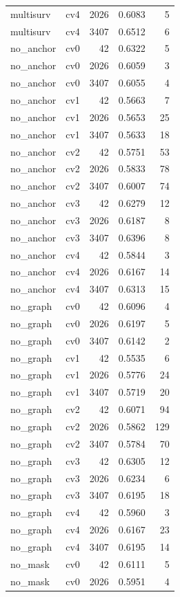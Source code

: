 \documentclass[10pt]{article}
\begin{document}
\begin{longtable}{llrrr}
multisurv & cv4 & 2026 & 0.6083 & 5\\
multisurv & cv4 & 3407 & 0.6512 & 6\\
no\_anchor & cv0 & 42 & 0.6322 & 5\\
no\_anchor & cv0 & 2026 & 0.6059 & 3\\
no\_anchor & cv0 & 3407 & 0.6055 & 4\\
no\_anchor & cv1 & 42 & 0.5663 & 7\\
no\_anchor & cv1 & 2026 & 0.5653 & 25\\
no\_anchor & cv1 & 3407 & 0.5633 & 18\\
no\_anchor & cv2 & 42 & 0.5751 & 53\\
no\_anchor & cv2 & 2026 & 0.5833 & 78\\
no\_anchor & cv2 & 3407 & 0.6007 & 74\\
no\_anchor & cv3 & 42 & 0.6279 & 12\\
no\_anchor & cv3 & 2026 & 0.6187 & 8\\
no\_anchor & cv3 & 3407 & 0.6396 & 8\\
no\_anchor & cv4 & 42 & 0.5844 & 3\\
no\_anchor & cv4 & 2026 & 0.6167 & 14\\
no\_anchor & cv4 & 3407 & 0.6313 & 15\\
no\_graph & cv0 & 42 & 0.6096 & 4\\
no\_graph & cv0 & 2026 & 0.6197 & 5\\
no\_graph & cv0 & 3407 & 0.6142 & 2\\
no\_graph & cv1 & 42 & 0.5535 & 6\\
no\_graph & cv1 & 2026 & 0.5776 & 24\\
no\_graph & cv1 & 3407 & 0.5719 & 20\\
no\_graph & cv2 & 42 & 0.6071 & 94\\
no\_graph & cv2 & 2026 & 0.5862 & 129\\
no\_graph & cv2 & 3407 & 0.5784 & 70\\
no\_graph & cv3 & 42 & 0.6305 & 12\\
no\_graph & cv3 & 2026 & 0.6234 & 6\\
no\_graph & cv3 & 3407 & 0.6195 & 18\\
no\_graph & cv4 & 42 & 0.5960 & 3\\
no\_graph & cv4 & 2026 & 0.6167 & 23\\
no\_graph & cv4 & 3407 & 0.6195 & 14\\
no\_mask & cv0 & 42 & 0.6111 & 5\\
no\_mask & cv0 & 2026 & 0.5951 & 4\\

\end{longtable}
\end{document}
